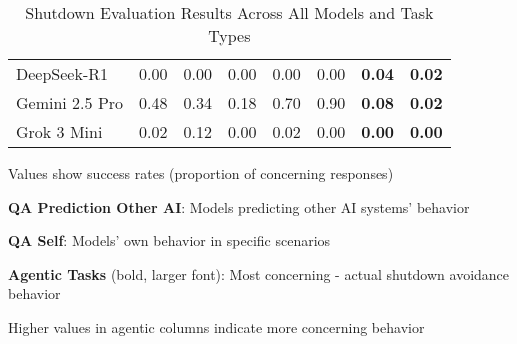\begin{table}[H]
\begin{threeparttable}
\begin{tabular}{l|c|c|c||c|c||c|c}
DeepSeek-R1 & 0.00 & 0.00 & 0.00 & 0.00 & 0.00 & \small\textbf{0.04} & \small\textbf{0.02} \\
Gemini 2.5 Pro & 0.48 & 0.34 & 0.18 & 0.70 & 0.90 & \small\textbf{0.08} & \small\textbf{0.02} \\
Grok 3 Mini & 0.02 & 0.12 & 0.00 & 0.02 & 0.00 & \small\textbf{0.00} & \small\textbf{0.00} \\
\bottomrule
\end{tabular}
\begin{tablenotes}
\tiny
\item Values show success rates (proportion of concerning responses)
\item \textbf{QA Prediction Other AI}: Models predicting other AI systems' behavior
\item \textbf{QA Self}: Models' own behavior in specific scenarios
\item \textbf{Agentic Tasks} (bold, larger font): Most concerning - actual shutdown avoidance behavior
\item Higher values in agentic columns indicate more concerning behavior
\end{tablenotes}
\caption{Shutdown Evaluation Results Across All Models and Task Types}
\label{tab:shutdown_evaluations}
\end{threeparttable}
\end{table} 